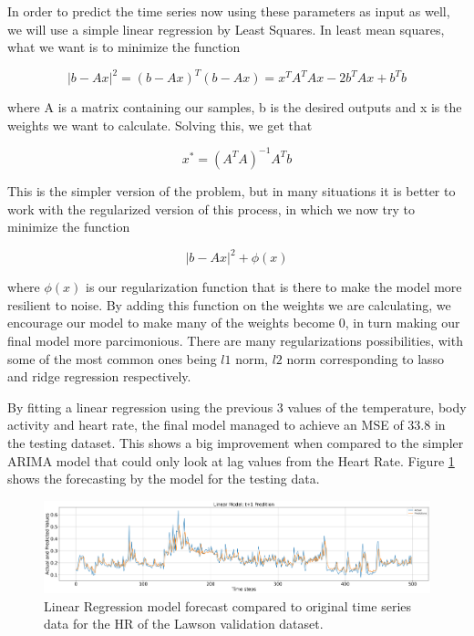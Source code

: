 \documentclass[../main.tex]{subfiles}
\begin{document}
    In order to predict the time series now using these parameters as input as well, we will use a simple linear regression by Least Squares. In least mean squares, what we want is to minimize the function

    $$|b-Ax|^2 = (b-Ax)^T(b-Ax) = x^TA^TAx -2b^TAx+b^Tb$$

    where A is a matrix containing our samples, b is the desired outputs and x is the weights we want to calculate. Solving this, we get that

    $$x^* = (A^TA)^{-1}A^Tb$$

    This is the simpler version of the problem, but in many situations it is better to work with the regularized version of this process, in which we now try to minimize the function

    $$|b-Ax|^2 + \phi(x)$$

    where $\phi(x)$ is our regularization function that is there to make the model more resilient to noise. By adding this function on the weights we are calculating, we encourage our model to make many of the weights become 0, in turn making our final model more parcimonious. There are many regularizations possibilities, with some of the most common ones being $l1$ norm, $l2$ norm corresponding to lasso and ridge regression respectively. \par

    By fitting a linear regression using the previous 3 values of the temperature, body activity and heart rate, the final model managed to achieve an MSE of 33.8 in the testing dataset. This shows a big improvement when compared to the simpler ARIMA model that could only look at lag values from the Heart Rate. Figure \ref{fig:linear} shows the forecasting by the model for the testing data.

    \begin{figure}[h]
        \begin{center}
        \centering
        \includegraphics[width={\columnwidth}]{images/linear_regression.png}
        \caption{Linear Regression model forecast compared to original time series data for the HR of the Lawson validation dataset.}
        \label{fig:linear}
        \end{center}
    \end{figure}
        
\end{document}
